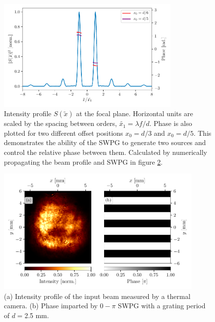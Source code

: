 \begin{figure}
	\centering
	\includegraphics[width=0.8\textwidth]{figures/Two_source/intensity_and_phase.pdf}
	\caption[Intensity profile at the focal plane of a $0-\pi$ SWPG]{Intensity profile $S(\tilde{x})$ at the focal plane. Horizontal units are scaled by the spacing between orders, $\tilde{x_1}=\lambda f/d$.  Phase is also plotted for two different offset positions $x_0=d/3$ and $x_0=d/5$.  This demonstrates the ability of the SWPG to generate two sources and control the relative phase between them. Calculated by numerically propagating the beam profile and SWPG in figure \ref{fig:LP_inputs}.}
	\label{fig:s^2}
\end{figure}
\begin{figure}
	\centering
	\includegraphics[width=0.9\textwidth]{figures/Two_source/LP_images.pdf}
	\caption[Measured beam profile and phase imparted by a SWPG]{(a) Intensity profile of the input beam measured by a thermal camera. (b) Phase imparted by $0-\pi$ SWPG with a grating period of $d=$2.5 mm.}
	\label{fig:LP_inputs}
\end{figure}

